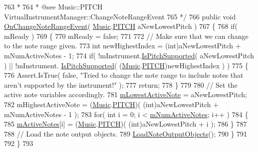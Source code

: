 \begin{DoxyCodeInclude}
763 \textcolor{comment}{     * }
764 \textcolor{comment}{     * @see Music::PITCH VirtualInstrumentManager::ChangeNoteRangeEvent}
765 \textcolor{comment}{    */}
766     \textcolor{keyword}{public} \textcolor{keywordtype}{void} \hyperlink{group___v_i_m_handlers_ga660c766dceebfc830de2cf96686692df}{OnChangeNoteRangeEvent}( \hyperlink{class_music}{Music}.\hyperlink{group___music_enums_ga508f69b199ea518f935486c990edac1d}{PITCH} aNewLowestPitch )
767     \{
768         \textcolor{keywordflow}{if}( mReady )
769         \{
770             mReady = \textcolor{keyword}{false};
771 
772             \textcolor{comment}{// Make sure that we can change to the note range given.}
773             \textcolor{keywordtype}{int} newHighestIndex = (int)aNewLowestPitch + mNumActiveNotes - 1;
774             \textcolor{keywordflow}{if}( !mInstrument.\hyperlink{group___v_i_base_pub_func_ga89655451c108a7ad5cb96ab308e33937}{IsPitchSupported}( aNewLowestPitch ) || !mInstrument.
      \hyperlink{group___v_i_base_pub_func_ga89655451c108a7ad5cb96ab308e33937}{IsPitchSupported}( (\hyperlink{class_music}{Music}.\hyperlink{group___music_enums_ga508f69b199ea518f935486c990edac1d}{PITCH})newHighestIndex ) )
775             \{
776                 Assert.IsTrue( \textcolor{keyword}{false}, \textcolor{stringliteral}{"Tried to change the note range to include notes that aren't
       supported by the instrument!"} );
777                 \textcolor{keywordflow}{return};
778             \}
779 
780             \textcolor{comment}{// Set the active note variables accordingly.}
781             \hyperlink{group___v_i_m_priv_ga5e3a5116e0dabb37e0ea21d73ac1567e}{mLowestActiveNote} = aNewLowestPitch;
782             mHighestActiveNote = (\hyperlink{class_music}{Music}.\hyperlink{group___music_enums_ga508f69b199ea518f935486c990edac1d}{PITCH})( (\textcolor{keywordtype}{int})aNewLowestPitch + mNumActiveNotes - 1 );
783             \textcolor{keywordflow}{for}( \textcolor{keywordtype}{int} i = 0; i < \hyperlink{group___v_i_m_priv_ga0f7e11945763c48057be326b661dfdaf}{mNumActiveNotes}; i++ )
784             \{
785                 \hyperlink{group___v_i_m_priv_ga5cedf9995d59b416412677e6004b659c}{mActiveNotes}[i] = (\hyperlink{class_music}{Music}.\hyperlink{group___music_enums_ga508f69b199ea518f935486c990edac1d}{PITCH})( (\textcolor{keywordtype}{int})aNewLowestPitch + i );
786             \}
787 
788             \textcolor{comment}{// Load the note output objects.}
789             \hyperlink{group___v_i_m_priv_func_ga8817e32cc5074737b4d9489922b0fcb8}{LoadNoteOutputObjects}();
790         \}
791 
792     \}
793 \textcolor{comment}{}

\end{DoxyCodeInclude}
